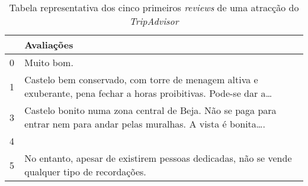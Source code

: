 \begin{table}[!ht]
  \centering
  \begin{adjustbox}{width=\columnwidth,center}
    \begin{tabular}{|l|l|}
      \hline
      ~      & Avaliações                                                                                                               \\ \hline
      0      & Muito bom.                                                                                                               \\ \hline
      1      & Castelo bem conservado, com torre de menagem altiva e exuberante, pena fechar a horas proibitivas. Pode-se dar a\ldots   \\ \hline
      3      & Castelo bonito numa zona central de Beja. Não se paga para entrar nem para andar pelas muralhas. A vista é bonita\ldots. \\ \hline
      4      & ~                                                                                                                        \\ \hline
      5      & No entanto, apesar de existirem pessoas dedicadas, não se vende qualquer tipo de recordações.                            \\ \hline
    \end{tabular}
  \end{adjustbox}
  \caption{Tabela representativa dos cinco primeiros \textit{reviews} de uma atracção do \textit{TripAdvisor}}
  \label{table:6}
\end{table}

